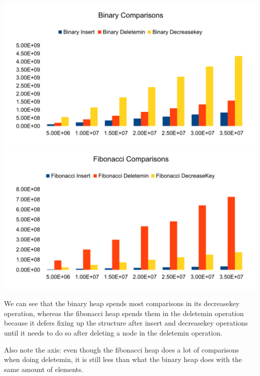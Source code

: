 \includegraphics[width=\textwidth]{graphs/bin_comp.pdf}
\includegraphics[width=\textwidth]{graphs/fib_comp.pdf}

We can see that the binary heap spends most comparisons in its decreasekey operation, whereas the fibonacci heap spends them in the deletemin operation because it defers fixing up the structure after insert and decreasekey operations until it needs to do so after deleting a node in the deletemin operation.

Also note the axis: even though the fibonacci heap does a lot of comparisons when doing deletemin, it is still less than what the binary heap does with the same amount of elements.

